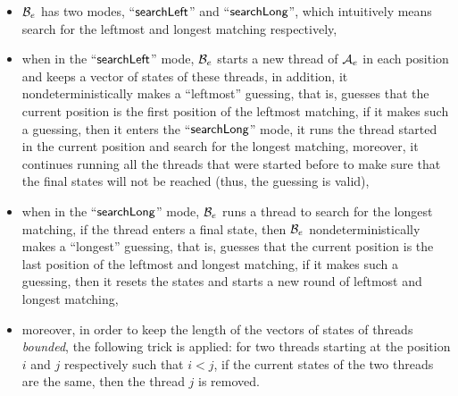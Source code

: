 \begin{itemize}
\item $\mathcal{B}_e$ has two modes, ``$\mathsf{searchLeft}$'' and ``$\mathsf{searchLong}$'', which intuitively means search for the leftmost and longest matching respectively,
	\item when in the ``$\mathsf{searchLeft}$'' mode, $\mathcal{B}_e$ starts a new thread of $\mathcal{A}_e$ in each position and keeps a vector of states of these threads, in addition, it nondeterministically makes a ``leftmost'' guessing, that is, guesses that the current position is the first position of the leftmost matching, if it makes such a guessing, then it enters the ``$\mathsf{searchLong}$'' mode, it runs the thread started in the current position and search for the longest matching, moreover, it continues running all the threads that were started before to make sure that the final states will not be reached (thus, the guessing is valid),
	\item when in the ``$\mathsf{searchLong}$'' mode, $\mathcal{B}_e$ runs a thread to search for the longest matching, if the thread enters a final state, then $\mathcal{B}_e$ nondeterministically makes a ``longest'' guessing, that is, guesses that the current position is the last position of the leftmost and longest matching, if it makes such a guessing, then it resets the states and starts a new round of leftmost and longest matching,
%
%
	\item moreover, in order to keep the length of the vectors of states of threads \emph{bounded}, the following trick is applied: for two threads starting at the position $i$ and $j$ respectively such that $i < j$, if the current states of the two threads are the same, then the thread $j$ is removed.
\end{itemize}
